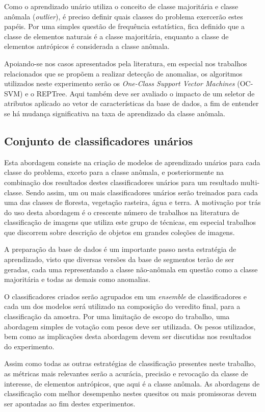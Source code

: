 Como o aprendizado unário utiliza o conceito de classe majoritária e classe anômala (\textit{outlier}), é preciso definir quais classes do problema exercerão estes papéis. Por uma simples questão de frequência estatística, fica definido que a classe de elementos naturais é a classe majoritária, enquanto a classe de elementos antrópicos é considerada a classe anômala.

Apoiando-se nos casos apresentados pela literatura, em especial nos trabalhos relacionados que se propõem a realizar detecção de anomalias, os algoritmos utilizados neste experimento serão os \textit{One-Class Support Vector Machines} (OC-SVM) e o REPTree. Aqui também deve ser avaliado o impacto de um seletor de atributos aplicado ao vetor de características da base de dados, a fim de entender se há mudança significativa na taxa de aprendizado da classe anômala.

\subsection{Conjunto de classificadores unários}

Esta abordagem consiste na criação de modelos de aprendizado unários para cada classe do problema, exceto para a classe anômala, e posteriormente na combinação dos resultados destes classificadores unários para um resultado multi-classe. Sendo assim, um ou mais classificadores unários serão treinados para cada uma das classes de floresta, vegetação rasteira, água e terra. A motivação por trás do uso desta abordagem é o crescente número de trabalhos na literatura de classificação de imagens que utiliza este grupo de técnicas, em especial trabalhos que discorrem sobre descrição de objetos em grandes coleções de imagens.

A preparação da base de dados é um importante passo nesta estratégia de aprendizado, visto que diversas versões da base de segmentos terão de ser geradas, cada uma representando a classe não-anômala em questão como a classe majoritária e todas as demais como anomalias.

O classificadores criados serão agrupados em um \textit{ensemble} de classificadores e cada um dos modelos será utilizado na composição do veredito final, para a classificação da amostra. Por uma limitação de escopo do trabalho, uma abordagem simples de votação com pesos deve ser utilizada. Os pesos utilizados, bem como as implicações desta abordagem devem ser discutidas nos resultados do experimento.

Assim como todas as outras estratégias de classificação presentes neste trabalho, as métricas mais relevantes serão a acurácia, precisão e revocação da classe de interesse, de elementos antrópicos, que aqui é a classe anômala. As abordagens de classificação com melhor desempenho nestes quesitos ou mais promissoras devem ser apontadas ao fim destes experimentos.

